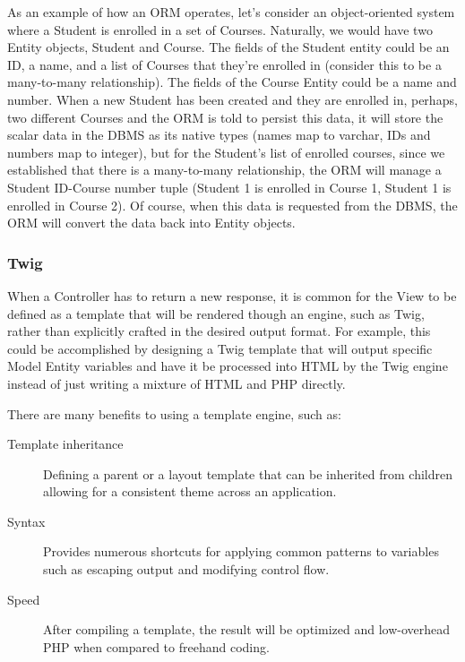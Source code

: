 As an example of how an ORM operates, let's consider an object-oriented system where a Student is enrolled in a set of Courses. Naturally, we would have two Entity objects, Student and Course. The fields of the Student entity could be an ID, a name, and a list of Courses that they're enrolled in (consider this to be a many-to-many relationship). The fields of the Course Entity could be a name and number. When a new Student has been created and they are enrolled in, perhaps, two different Courses and the ORM is told to persist this data, it will store the scalar data in the  DBMS as its native types (names map to varchar, IDs and numbers map to integer), but for the Student's list of enrolled courses, since we established that there is a many-to-many relationship, the ORM will manage a Student ID-Course number tuple (Student 1 is enrolled in Course 1, Student 1 is enrolled in Course 2). Of course, when this data is requested from the DBMS, the ORM will convert the data back into Entity objects.

\subsubsection{Twig}
When a Controller has to return a new response, it is common for the View to be defined as a template that will be rendered though an engine, such as Twig, rather than explicitly crafted in the desired output format. For example, this could be accomplished by designing a Twig template that will output specific Model Entity variables and have it be processed into HTML by the Twig engine instead of just writing a mixture of HTML and PHP directly.

There are many benefits to using a template engine, such as:

\begin{description}
	\item [Template inheritance] Defining a parent or a layout template that can be inherited from children allowing for a consistent theme across an application.
	\item [Syntax] Provides numerous shortcuts for applying common patterns to variables such as escaping output and modifying control flow.
	\item [Speed] After compiling a template, the result will be optimized and low-overhead PHP when compared to freehand coding.
\end{description}

